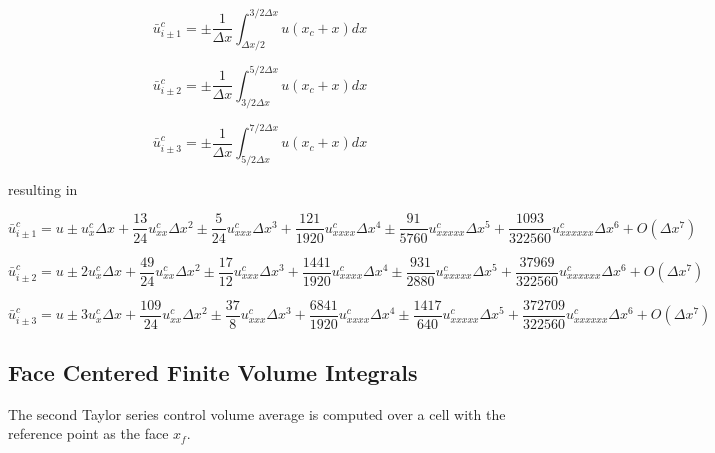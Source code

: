 \documentclass[10pt]{article}%
\begin{document}
\[
\bar u_{i\pm1}^c = \pm\frac{1}{\Delta x} \int_{\Delta x/2}^{3/2\Delta x} u(x_c+x) dx 
\]

\[
\bar u_{i\pm2}^c = \pm\frac{1}{\Delta x} \int_{3/2 \Delta x}^{5/2\Delta x} u(x_c+x) dx 
\]

\[
\bar u_{i\pm3}^c = \pm\frac{1}{\Delta x} \int_{5/2 \Delta x}^{7/2\Delta x} u(x_c+x) dx 
\]

resulting in

\[
\bar u_{i\pm1}^c = u 
  \pm                     u^c_x      \Delta x   
  + \frac{13}{24}         u^c_{xx}   \Delta x^2 
  \pm \frac{5}{24}        u^c_{xxx}  \Delta x^3 
  + \frac{121}{1920}      u^c_{xxxx} \Delta x^4 
  \pm \frac{91}{5760}     u^c_{xxxxx} \Delta x^5 
  + \frac{1093}{322560}   u^c_{xxxxxx} \Delta x^6 
  + O(\Delta x^7)
\]


\[
\bar u_{i\pm2}^c = u 
  \pm 2                   u^c_x      \Delta x 
  + \frac{49}{24}         u^c_{xx}   \Delta x^2 
  \pm \frac{17}{12}       u^c_{xxx}  \Delta x^3 
  + \frac{1441}{1920}     u^c_{xxxx} \Delta x^4 
  \pm \frac{931}{2880}    u^c_{xxxxx} \Delta x^5 
  + \frac{37969}{322560}  u^c_{xxxxxx} \Delta x^6 
  + O(\Delta x^7)
\]


\[
\bar u_{i\pm3}^c = u 
  \pm 3                    u^c_x      \Delta x   
  + \frac{109}{24}         u^c_{xx}   \Delta x^2 
  \pm \frac{37}{8}         u^c_{xxx}  \Delta x^3 
  + \frac{6841}{1920}      u^c_{xxxx} \Delta x^4 
  \pm \frac{1417}{640}     u^c_{xxxxx} \Delta x^5 
  + \frac{372709}{322560}  u^c_{xxxxxx} \Delta x^6 
  + O(\Delta x^7)
\]


\subsection{Face Centered Finite Volume Integrals}

The second Taylor series control volume average is computed over a cell with the reference point as the face $x_{f}$.
\end{document}
